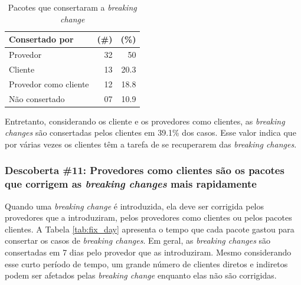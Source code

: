 \begin{table}
	\centering
	\caption{Pacotes que consertaram a \textit{breaking change}}
	\begin{tabular}{lrr}
		\toprule
		\textbf{Consertado por} & \textbf{(\#)} & \textbf{(\%)} \\ \hline
		Provedor                & 32            & 50            \\
		Cliente                 & 13            & 20.3          \\
		Provedor como cliente   & 12            & 18.8          \\
		Não consertado          & 07            & 10.9          \\ \bottomrule
	\end{tabular}
	\label{tab:package_fix}
\end{table}

Entretanto, considerando os cliente e os provedores como clientes, as \textit{breaking changes} são consertadas pelos clientes em 39.1\% dos casos. Esse valor indica que por várias vezes os clientes têm a tarefa de se recuperarem das \textit{breaking changes}.

\subsubsection{Descoberta \#11: Provedores como clientes são os pacotes que corrigem as \textit{breaking changes} mais rapidamente}

Quando uma \textit{breaking change} é introduzida, ela deve ser corrigida pelos provedores que a introduziram, pelos provedores como clientes ou pelos pacotes clientes. A Tabela \ref{tab:fix_day} apresenta o tempo que cada pacote gastou para consertar os casos de \textit{breaking changes}. Em geral, as \textit{breaking changes} são consertadas em 7 dias pelo provedor que as introduziram. Mesmo considerando esse curto período de tempo, um grande número de clientes diretos e indiretos podem ser afetados pelas \textit{breaking change} enquanto elas não são corrigidas.

